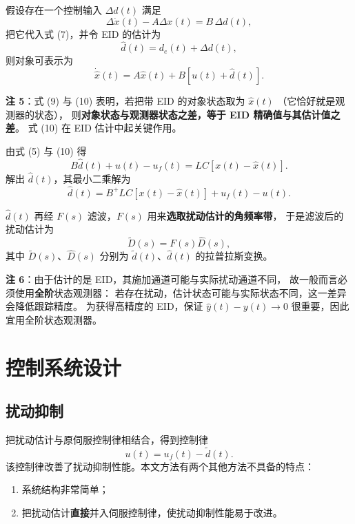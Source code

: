\documentclass[11pt,a4paper]{ctexart}
\begin{document}
假设存在一个控制输入 $\Delta d(t)$ 满足
\begin{equation}
\Delta\dot x(t)-A\Delta x(t)=B\,\Delta d(t),
\end{equation}
把它代入式 (7)，并令 EID 的估计为
\begin{equation}
\hat d(t)=d_e(t)+\Delta d(t),
\end{equation}
则对象可表示为
\begin{equation}
\dot{\hat x}(t)=A\hat x(t)+B\left[u(t)+\hat d(t)\right].
\end{equation}

\textbf{注 5}：式 (9) 与 (10) 表明，若把带 EID 的对象状态取为 $\hat x(t)$
（它恰好就是观测器的状态），
则\textbf{对象状态与观测器状态之差，等于 EID 精确值与其估计值之差}。
式 (10) 在 EID 估计中起关键作用。

由式 (5) 与 (10) 得
\begin{equation}
B\hat d(t)+u(t)-u_f(t)=LC\left[x(t)-\hat x(t)\right].
\end{equation}
解出 $\hat d(t)$，其最小二乘解为
\begin{equation}
\hat d(t)=B^{+}LC\left[x(t)-\hat x(t)\right]+u_f(t)-u(t).
\end{equation}

$\hat d(t)$ 再经 $F(s)$ 滤波，$F(s)$ 用来\textbf{选取扰动估计的角频率带}，
于是滤波后的扰动估计为
\begin{equation}
\tilde D(s)=F(s)\hat D(s),
\end{equation}
其中 $\tilde D(s)$、$\hat D(s)$ 分别为 $\tilde d(t)$、$\hat d(t)$ 的拉普拉斯变换。

\textbf{注 6}：由于估计的是 EID，其施加通道可能与实际扰动通道不同，
故一般而言必须使用\textbf{全阶}状态观测器：
若存在扰动，估计状态可能与实际状态不同，这一差异会降低跟踪精度。
为获得高精度的 EID，保证 $\hat y(t)-y(t)\to 0$ 很重要，因此宜用全阶状态观测器。

\section{控制系统设计}

\subsection{扰动抑制}

把扰动估计与原伺服控制律相结合，得到控制律
\begin{equation}
u(t)=u_f(t)-\tilde d(t).
\end{equation}
该控制律改善了扰动抑制性能。本文方法有两个其他方法不具备的特点：
\begin{enumerate}[label=(\alph*)]
\item 系统结构非常简单；
\item 把扰动估计\textbf{直接}并入伺服控制律，使扰动抑制性能易于改进。
\end{enumerate}
\end{document}
